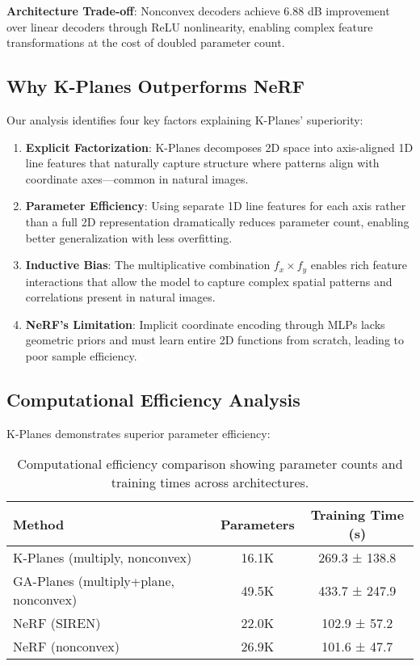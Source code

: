 \documentclass{article}
\begin{document}
\textbf{Architecture Trade-off}: Nonconvex decoders achieve 6.88 dB improvement over linear decoders through ReLU nonlinearity, enabling complex feature transformations at the cost of doubled parameter count.

\subsection{Why K-Planes Outperforms NeRF}

Our analysis identifies four key factors explaining K-Planes' superiority:

\begin{enumerate}
\item \textbf{Explicit Factorization}: K-Planes decomposes 2D space into axis-aligned 1D line features that naturally capture structure where patterns align with coordinate axes—common in natural images.

\item \textbf{Parameter Efficiency}: Using separate 1D line features for each axis rather than a full 2D representation dramatically reduces parameter count, enabling better generalization with less overfitting.

\item \textbf{Inductive Bias}: The multiplicative combination $f_x \times f_y$ enables rich feature interactions that allow the model to capture complex spatial patterns and correlations present in natural images.

\item \textbf{NeRF's Limitation}: Implicit coordinate encoding through MLPs lacks geometric priors and must learn entire 2D functions from scratch, leading to poor sample efficiency.
\end{enumerate}

\subsection{Computational Efficiency Analysis}

K-Planes demonstrates superior parameter efficiency:

\begin{table}[t]
\centering
\small
\begin{tabular}{@{}lcc@{}}
\toprule
\textbf{Method} & \textbf{Parameters} & \textbf{Training Time (s)} \\
\midrule
K-Planes (multiply, nonconvex) & 16.1K & 269.3 ± 138.8 \\
GA-Planes (multiply+plane, nonconvex) & 49.5K & 433.7 ± 247.9 \\
NeRF (SIREN) & 22.0K & 102.9 ± 57.2 \\
NeRF (nonconvex) & 26.9K & 101.6 ± 47.7 \\
\bottomrule
\end{tabular}
\caption{Computational efficiency comparison showing parameter counts and training times across architectures.}
\label{tab:efficiency}
\end{table}
\end{document}
